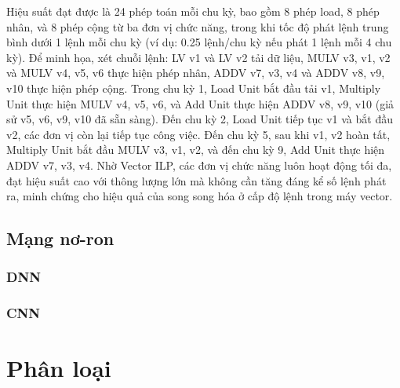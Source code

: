 \documentclass[a4paper]{article}
\begin{document}
Hiệu suất đạt được là 24 phép toán mỗi chu kỳ, bao gồm 8 phép load, 8 phép nhân, và 8 phép cộng từ ba đơn vị chức năng, trong khi tốc độ phát lệnh trung bình dưới 1 lệnh mỗi chu kỳ (ví dụ: 0.25 lệnh/chu kỳ nếu phát 1 lệnh mỗi 4 chu kỳ). Để minh họa, xét chuỗi lệnh: LV v1 và LV v2 tải dữ liệu, MULV v3, v1, v2 và MULV v4, v5, v6 thực hiện phép nhân, ADDV v7, v3, v4 và ADDV v8, v9, v10 thực hiện phép cộng. Trong chu kỳ 1, Load Unit bắt đầu tải v1, Multiply Unit thực hiện MULV v4, v5, v6, và Add Unit thực hiện ADDV v8, v9, v10 (giả sử v5, v6, v9, v10 đã sẵn sàng). Đến chu kỳ 2, Load Unit tiếp tục v1 và bắt đầu v2, các đơn vị còn lại tiếp tục công việc. Đến chu kỳ 5, sau khi v1, v2 hoàn tất, Multiply Unit bắt đầu MULV v3, v1, v2, và đến chu kỳ 9, Add Unit thực hiện ADDV v7, v3, v4. Nhờ Vector ILP, các đơn vị chức năng luôn hoạt động tối đa, đạt hiệu suất cao với thông lượng lớn mà không cần tăng đáng kể số lệnh phát ra, minh chứng cho hiệu quả của song song hóa ở cấp độ lệnh trong máy vector.

\subsection{Mạng nơ-ron}
\subsubsection{DNN}
\subsubsection{CNN}
\section{Phân loại}
\end{document}
